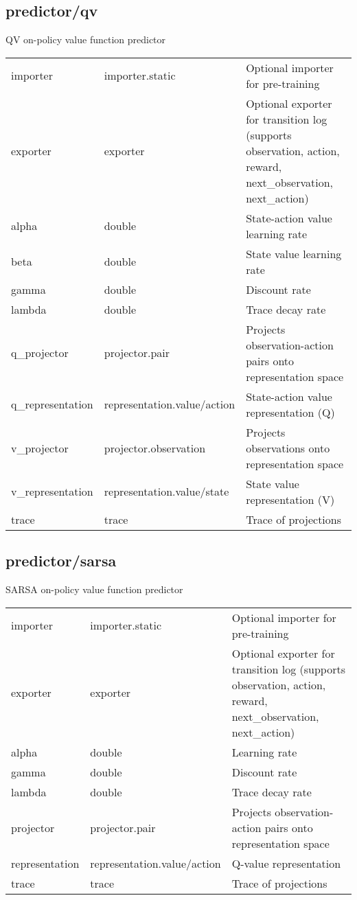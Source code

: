 \subsection{predictor/qv}
\noindent QV on-policy value function predictor\\

\noindent\begin{tabular}{@{}lll@{}}
importer&importer.static&Optional importer for pre-training\\
exporter&exporter&Optional exporter for transition log (supports observation, action, reward, next\_observation, next\_action)\\
alpha&double&State-action value learning rate\\
beta&double&State value learning rate\\
gamma&double&Discount rate\\
lambda&double&Trace decay rate\\
q\_projector&projector.pair&Projects observation-action pairs onto representation space\\
q\_representation&representation.value/action&State-action value representation (Q)\\
v\_projector&projector.observation&Projects observations onto representation space\\
v\_representation&representation.value/state&State value representation (V)\\
trace&trace&Trace of projections\\
\end{tabular}
\subsection{predictor/sarsa}
\noindent SARSA on-policy value function predictor\\

\noindent\begin{tabular}{@{}lll@{}}
importer&importer.static&Optional importer for pre-training\\
exporter&exporter&Optional exporter for transition log (supports observation, action, reward, next\_observation, next\_action)\\
alpha&double&Learning rate\\
gamma&double&Discount rate\\
lambda&double&Trace decay rate\\
projector&projector.pair&Projects observation-action pairs onto representation space\\
representation&representation.value/action&Q-value representation\\
trace&trace&Trace of projections\\
\end{tabular}
